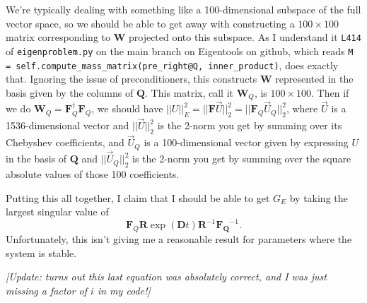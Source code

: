 \documentclass[aps,pop,preprint]{revtex4}
\begin{document}
We're typically dealing with something like a 100-dimensional subspace of the full vector space, so we should be able to get away with constructing a $100 \times 100$ matrix corresponding to $\mathbf{W}$ projected onto this subspace. 
As I understand it \texttt{L414} of \texttt{eigenproblem.py} on the main branch on Eigentools on github, which reads \texttt{M = self.compute\_mass\_matrix(pre\_right@Q, inner\_product)}, does exactly that. 
Ignoring the issue of preconditioners, this constructs $\mathbf{W}$ represented in the basis given by the columns of $\mathbf{Q}$. 
This matrix, call it $\mathbf{W}_Q$, is $100 \times 100$. 
Then if we do $\mathbf{W}_Q = \mathbf{F}^\dagger_Q \mathbf{F}_Q$, we should have $||U||_E^2 = ||\mathbf{F} \vec{U}||_2^2 = ||\mathbf{F}_Q \vec{U}_Q||_2^2$, where $\vec{U}$ is a 1536-dimensional vector and $||\vec{U}||_2^2$ is the 2-norm you get by summing over its Chebyshev coefficients, and $\vec{U}_Q$ is a 100-dimensional vector given by expressing $U$ in the basis of $\mathbf{Q}$ and $||\vec{U}_Q||_2^2$ is the 2-norm you get by summing over the square absolute values of those 100 coefficients.

Putting this all together, I claim that I should be able to get $G_E$ by taking the largest singular value of
\begin{equation}
\mathbf{F}_Q \mathbf{R} \exp(\mathbf{D} t) \mathbf{R}^{-1} \mathbf{F_Q}^{-1}.
\end{equation}
Unfortunately, this isn't giving me a reasonable result for parameters where the system is stable.

\textit{[Update: turns out this last equation was absolutely correct, and I was just missing a factor of $i$ in my code!]}
\end{document}
